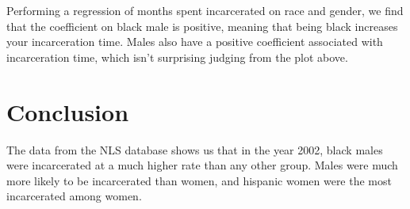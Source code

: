 \documentclass{article}
\begin{document}
Performing a regression of months spent incarcerated on race and gender, we find that the coefficient on black male is positive, meaning that being black increases your incarceration time. Males also have a positive coefficient associated with incarceration time, which isn't surprising judging from the plot above.



\section{Conclusion}

The data from the NLS database shows us that in the year 2002, black males were incarcerated at a much higher rate than any other group. Males were much more likely to be incarcerated than women, and hispanic women were the most incarcerated among women.
\end{document}

